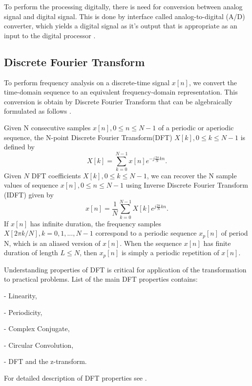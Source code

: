 \documentclass[twoside]{ctuthesis}
\theoremstyle{plain}
\theoremstyle{definition}
\theoremstyle{note}
\begin{document}
	To perform the processing digitally, there is need for conversion between analog signal and digital signal. This is done by interface called analog-to-digital (A/D) converter, which yields a digital signal as it's output that is appropriate as an input to the digital processor \cite{cite:2,cite:3}.
	
\subsection{Discrete Fourier Transform}
To perform frequency analysis on a discrete-time signal ${x[n]}$, we convert the time-domain sequence to an equivalent frequency-domain representation. This conversion is obtain by Discrete Fourier Transform that can be algebraically formulated as follows \cite{cite:2,cite:3}.
	
Given N consecutive samples $x[n], 0 \leq n \leq N-1$ of a periodic or aperiodic sequence, the N-point Discrete Fourier Transform(DFT) $X[k], 0 \leq k \leq N-1$ is defined by
\begin{equation} \label{eq:DFT}
X[k]=\sum_{k=0}^{N-1}x[n]e^{-j \frac{2 \pi}{N} kn}.
\end{equation}
Given $N$ DFT coefficients $X[k], 0 \leq k \leq N-1$, we can recover the N sample values of sequence $x[n], 0 \leq n \leq N-1$ using Inverse Discrete Fourier Transform (IDFT) given by
\begin{equation} \label{eq:IDFT}
x[n]=\frac{1}{N} \sum_{k=0}^{N-1}X[k]e^{j \frac{2 \pi}{N} kn}.
\end{equation}
If $x[n]$ has infinite duration, the frequency samples  $X[2 \pi k/ N], k=0, 1, ..., N-1$ correspond to a periodic sequence $x_{p}[n]$ of period N, which is an aliased version of $x[n]$. When the sequence $x[n]$ has finite duration of length $L \leq N$, then  $x_{p}[n]$ is simply a periodic repetition of $x[n]$.

Understanding properties of DFT is critical for application of the transformation to practical problems. List of the main DFT properties contains:

- Linearity,

- Periodicity,

- Complex Conjugate,

- Circular Convolution,

- DFT and the z-transform.

For detailed description of DFT properties see \cite{cite:2,cite:RT_DSP}.
\end{document}
